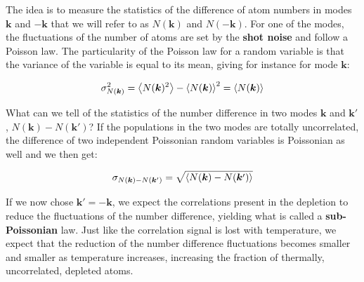 

 The idea is to measure the statistics of the difference of atom numbers in modes $\bm{k}$ and $-\bm{k}$ that we will refer to as $N(\bm{k})$ and $N(-\bm{k})$. For one of the modes, the fluctuations of the number of atoms are set by the \textbf{shot noise} and follow a Poisson law. The particularity of the Poisson law for a random variable is that the variance of the variable is equal to its mean, giving for instance for mode $\bm{k}$:

\begin{equation}
    \sigma_{N(\bm{k})}^2 =\left\langle N(\bm{k})^2\right\rangle-\left\langle N(\bm{k})\right\rangle^2 = \left\langle N(\bm{k})\right\rangle
\end{equation}

What can we tell of the statistics of the number difference in two modes $\bm{k}$ and $\bm{k}'$, $N(\bm{k}) - N(\bm{k}')$? If the populations in the two modes are totally uncorrelated, the difference of two independent Poissonian random variables is Poissonian as well and we then get:

\begin{equation}
    \sigma_{N(\bm{k})-N(\bm{k}')} = \sqrt{\left\langle N(\bm{k})-N(\bm{k}')\right\rangle}
\end{equation}

If we now chose $\bm{k}'=-\bm{k}$, we expect the \kmk correlations present in the depletion to reduce the fluctuations of the number difference, yielding what is called a \textbf{sub-Poissonian} law. Just like the \kmk correlation signal is lost with temperature, we expect that the reduction of the number difference fluctuations becomes smaller and smaller as temperature increases, increasing the fraction of thermally, uncorrelated, depleted atoms. 

